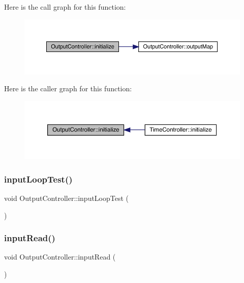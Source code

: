 Here is the call graph for this function\+:
\nopagebreak
\begin{figure}[H]
\begin{center}
\leavevmode
\includegraphics[width=350pt]{class_output_controller_a6c7741fe241177b6c0d1236df4c9d358_cgraph}
\end{center}
\end{figure}
Here is the caller graph for this function\+:
\nopagebreak
\begin{figure}[H]
\begin{center}
\leavevmode
\includegraphics[width=350pt]{class_output_controller_a6c7741fe241177b6c0d1236df4c9d358_icgraph}
\end{center}
\end{figure}
\mbox{\label{class_output_controller_a3e855ce6665a2f127a2dc50d04ff0a1c}} 
\subsubsection{\texorpdfstring{input\+Loop\+Test()}{inputLoopTest()}}
{\footnotesize\ttfamily void Output\+Controller\+::input\+Loop\+Test (\begin{DoxyParamCaption}{ }\end{DoxyParamCaption})}

\mbox{\label{class_output_controller_a67591d82e2c023450e42976bf68b1af1}} 
\subsubsection{\texorpdfstring{input\+Read()}{inputRead()}}
{\footnotesize\ttfamily void Output\+Controller\+::input\+Read (\begin{DoxyParamCaption}{ }\end{DoxyParamCaption})}

